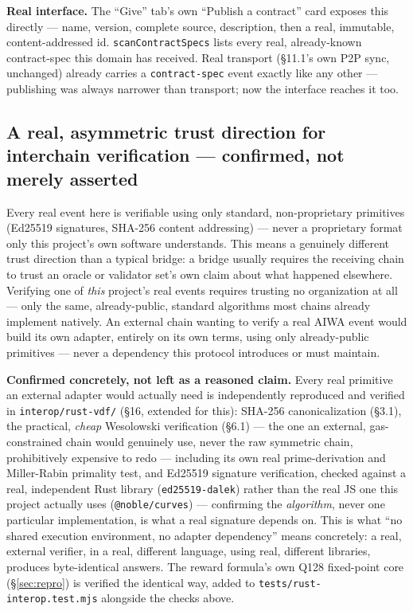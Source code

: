 \documentclass[10pt]{article}
\newcommand{\code}[1]{\texttt{\small #1}}
\begin{document}
\textbf{Real interface.} The ``Give'' tab's own ``Publish a contract'' card exposes this directly --- name, version, complete source, description, then a real, immutable, content-addressed id. \code{scanContractSpecs} lists every real, already-known contract-spec this domain has received. Real transport (\S11.1's own P2P sync, unchanged) already carries a \code{contract-spec} event exactly like any other --- publishing was always narrower than transport; now the interface reaches it too.

\subsection{A real, asymmetric trust direction for interchain verification --- confirmed, not merely asserted}

Every real event here is verifiable using only standard, non-proprietary primitives (Ed25519 signatures, SHA-256 content addressing) --- never a proprietary format only this project's own software understands. This means a genuinely different trust direction than a typical bridge: a bridge usually requires the receiving chain to trust an oracle or validator set's own claim about what happened elsewhere. Verifying one of \emph{this} project's real events requires trusting no organization at all --- only the same, already-public, standard algorithms most chains already implement natively. An external chain wanting to verify a real AIWA event would build its own adapter, entirely on its own terms, using only already-public primitives --- never a dependency this protocol introduces or must maintain.

\textbf{Confirmed concretely, not left as a reasoned claim.} Every real primitive an external adapter would actually need is independently reproduced and verified in \code{interop/rust-vdf/} (\S16, extended for this): SHA-256 canonicalization (\S3.1), the practical, \emph{cheap} Wesolowski verification (\S6.1) --- the one an external, gas-constrained chain would genuinely use, never the raw symmetric chain, prohibitively expensive to redo --- including its own real prime-derivation and Miller-Rabin primality test, and Ed25519 signature verification, checked against a real, independent Rust library (\code{ed25519-dalek}) rather than the real JS one this project actually uses (\code{@noble/curves}) --- confirming the \emph{algorithm}, never one particular implementation, is what a real signature depends on. This is what ``no shared execution environment, no adapter dependency'' means concretely: a real, external verifier, in a real, different language, using real, different libraries, produces byte-identical answers. The reward formula's own Q128 fixed-point core (\S\ref{sec:repro}) is verified the identical way, added to \code{tests/rust-interop.test.mjs} alongside the checks above.
\end{document}
